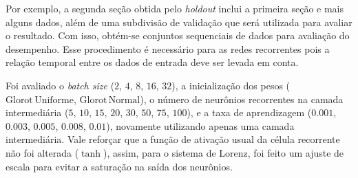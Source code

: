 \documentclass[9pt, technote]{article}
\newcommand{\glorot}{\text{Glorot}}
\newcommand{\normal}{\text{Normal}}
\newcommand{\uniform}{\text{Uniforme}}
\begin{document}
Por exemplo, a segunda seção obtida pelo \textit{holdout} inclui a primeira seção e mais alguns dados, além de uma subdivisão de validação que será utilizada para avaliar o resultado. Com isso, obtém-se conjuntos sequenciais de dados para avaliação do desempenho. Esse procedimento é necessário para as redes recorrentes pois a relação temporal entre os dados de entrada deve ser levada em conta.

Foi avaliado o \textit{batch size} ($2$, $4$, $8$, $16$, $32$), a inicialização dos pesos ($\glorot \, \uniform$, $\glorot \, \normal$), o número de neurônios recorrentes na camada intermediária ($5$, $10$, $15$, $20$, $30$, $50$, $75$, $100$), e a taxa de aprendizagem ($0.001$, $0.003$, $0.005$, $0.008$, $0.01$), novamente utilizando apenas uma camada intermediária. Vale reforçar que a função de ativação usual da célula recorrente não foi alterada ($\tanh$), assim, para o sistema de Lorenz, foi feito um ajuste de escala para evitar a saturação na saída dos neurônios.
\end{document}
